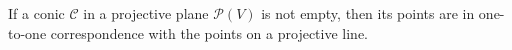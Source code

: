 If a conic $\mathcal{C}$ in a projective plane $\mathcal{P}(V)$ is not empty, then its points are in one-to-one correspondence with the points on a projective line.
